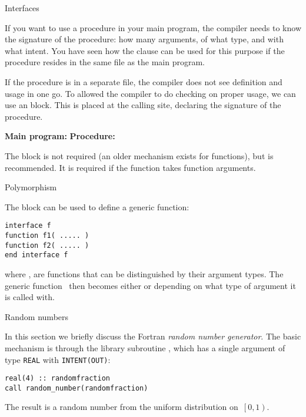 
 {Interfaces}
\label{sec:finterface}

If you want to use a procedure in your main program, the compiler
needs to know the signature of the procedure: how many arguments, of
what type, and with what intent. You have seen how the
 clause can be used for this purpose if the
procedure resides in the same file as the main program.

If the procedure is in a separate file, the compiler does not see
definition and usage in one go. To allowed the compiler to do checking
on proper usage, we can use an  block. This
is placed at the calling site, declaring the signature of the
procedure.

\begin{multicols}{2}
\textbf{Main program:}
\vfill\columnbreak
\textbf{Procedure:}
\end{multicols}

The  block is not required (an older
 mechanism exists for functions), but is
recommended.
It is required if the function takes function arguments.

 {Polymorphism}

The  block can be used to define a generic
function:
\begin{lstlisting}
interface f
function f1( ..... )
function f2( ..... )
end interface f
\end{lstlisting}
where , are functions that can be distinguished by their
argument types. The generic function~ then becomes either 
or  depending on what type of argument it is called with.

 {Random numbers}

In this section we briefly discuss the Fortran \emph{random number
  generator}.
The basic mechanism is through the library subroutine
, which has a single argument of type
\lstinline{REAL} with \lstinline{INTENT(OUT)}:
\begin{lstlisting}
real(4) :: randomfraction
call random_number(randomfraction)
\end{lstlisting}
The result is a random number from the uniform distribution
on~$\left[0,1\right)$.
  
